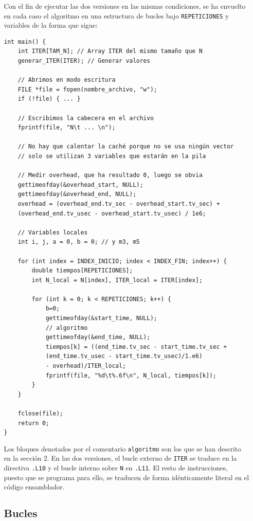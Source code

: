 \documentclass[11pt,a4paper,twoside]{article}
\theoremstyle{definition}
\begin{document}
	Con el fin de ejecutar las dos versiones en las mismas condiciones, se ha envuelto en cada caso el algoritmo en una estructura de bucles bajo \texttt{REPETICIONES} y variables de la forma que sigue:
	
	\begin{verbatim}
int main() {
	int ITER[TAM_N]; // Array ITER del mismo tamaño que N
	generar_ITER(ITER); // Generar valores
	
	// Abrimos en modo escritura
	FILE *file = fopen(nombre_archivo, "w"); 
	if (!file) { ... }
	
	// Escribimos la cabecera en el archivo
	fprintf(file, "N\t ... \n");
	
	// No hay que calentar la caché porque no se usa ningún vector
	// solo se utilizan 3 variables que estarán en la pila
	
	// Medir overhead, que ha resultado 0, luego se obvia
	gettimeofday(&overhead_start, NULL);
	gettimeofday(&overhead_end, NULL);
	overhead = (overhead_end.tv_sec - overhead_start.tv_sec) +
	(overhead_end.tv_usec - overhead_start.tv_usec) / 1e6;
	
	// Variables locales
	int i, j, a = 0, b = 0; // y m3, m5
	
	for (int index = INDEX_INICIO; index < INDEX_FIN; index++) {
		double tiempos[REPETICIONES];
		int N_local = N[index], ITER_local = ITER[index];
		
		for (int k = 0; k < REPETICIONES; k++) {
			b=0;
			gettimeofday(&start_time, NULL);
			// algoritmo
			gettimeofday(&end_time, NULL);
			tiempos[k] = ((end_time.tv_sec - start_time.tv_sec +
			(end_time.tv_usec - start_time.tv_usec)/1.e6)
			- overhead)/ITER_local;
			fprintf(file, "%d\t%.6f\n", N_local, tiempos[k]);
		}
	}
	
	fclose(file);
	return 0;
}
	\end{verbatim}

	Los bloques denotados por el comentario \texttt{algoritmo} son los que se han descrito en la sección 2. En las dos versiones, el bucle externo de \texttt{ITER} se traduce en la directiva \texttt{.L10} y el bucle interno sobre \texttt{N} en \texttt{.L11}. El resto de instrucciones, puesto que se programa para ello, se traducen de forma idénticamente literal en el código ensamblador.

	\subsection{Bucles}
	
\end{document}

